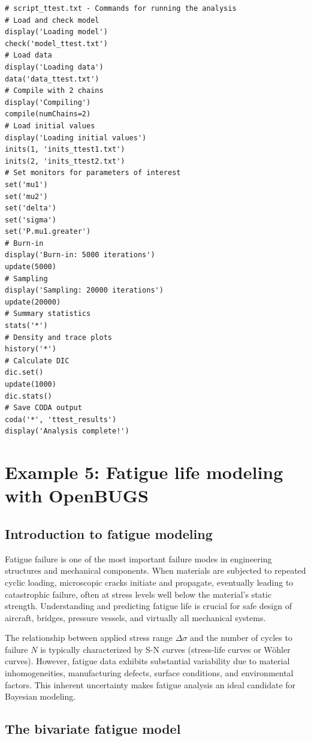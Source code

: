 \begin{codebox}
\begin{verbatim}
# script_ttest.txt - Commands for running the analysis
# Load and check model
display('Loading model')
check('model_ttest.txt')
# Load data
display('Loading data')
data('data_ttest.txt')
# Compile with 2 chains
display('Compiling')
compile(numChains=2)
# Load initial values
display('Loading initial values')
inits(1, 'inits_ttest1.txt')
inits(2, 'inits_ttest2.txt')
# Set monitors for parameters of interest
set('mu1')
set('mu2')
set('delta')
set('sigma')
set('P.mu1.greater')
# Burn-in
display('Burn-in: 5000 iterations')
update(5000)
# Sampling
display('Sampling: 20000 iterations')
update(20000)
# Summary statistics
stats('*')
# Density and trace plots
history('*')
# Calculate DIC
dic.set()
update(1000)
dic.stats()
# Save CODA output
coda('*', 'ttest_results')
display('Analysis complete!')
\end{verbatim}
\end{codebox}

\section{Example 5: Fatigue life modeling with OpenBUGS}
\label{sec:fatigue_example}

\subsection{Introduction to fatigue modeling}

Fatigue failure is one of the most important failure modes in engineering structures and mechanical components. When materials are subjected to repeated cyclic loading, microscopic cracks initiate and propagate, eventually leading to catastrophic failure, often at stress levels well below the material's static strength. Understanding and predicting fatigue life is crucial for safe design of aircraft, bridges, pressure vessels, and virtually all mechanical systems.

The relationship between applied stress range $\Delta\sigma$ and the number of cycles to failure $N$ is typically characterized by S-N curves (stress-life curves or Wöhler curves). However, fatigue data exhibits substantial variability due to material inhomogeneities, manufacturing defects, surface conditions, and environmental factors. This inherent uncertainty makes fatigue analysis an ideal candidate for Bayesian modeling.

\subsection{The bivariate fatigue model}

